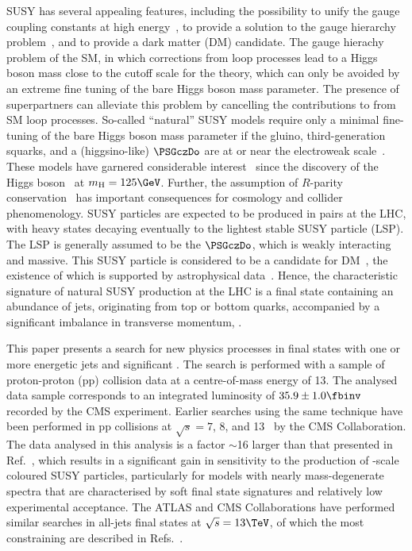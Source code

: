 SUSY has several appealing features, including the possibility to
unify the gauge coupling constants at high
energy~\cite{Dimopoulos:1981yj, Ibanez:1981yh, Marciano:1981un}, to
provide a solution to the gauge hierarchy
problem~\cite{ref:hierarchy1, ref:hierarchy2}, and to provide a dark
matter (DM) candidate. The gauge hierachy problem of the SM, in which
corrections from loop processes lead to a Higgs boson mass \higgsmass
close to the cutoff scale for the theory, which can only be avoided by
an extreme fine tuning of the bare Higgs boson mass parameter. The
presence of superpartners can alleviate this problem by cancelling the
contributions to \higgsmass from SM loop processes. So-called
``natural'' SUSY models require only a minimal fine-tuning of the bare
Higgs boson mass parameter if the gluino, third-generation squarks,
and a (higgsino-like) $\PSGczDo$ are at or near the electroweak
scale~\cite{ref:barbierinsusy}. These models have garnered
considerable interest~\cite{Delgado:2012eu, Boehm:1999tr,
  Carena:2008mj, Grober:2014aha, Grober:2015fia, Boehm:1999bj,
  Balazs:2004bu, Martin:2007gf, Martin:2007hn} since the discovery of
the Higgs boson~\cite{ref:atlashiggsdiscovery, ref:cmshiggsdiscovery,
  ref:cmshiggsdiscoverylong} at $\higgsmass = 125\GeV$. Further, the
assumption of $R$-parity conservation~\cite{Farrar:1978xj} has
important consequences for cosmology and collider phenomenology. SUSY
particles are expected to be produced in pairs at the LHC, with heavy
states decaying eventually to the lightest stable SUSY particle
(LSP). The LSP is generally assumed to be the $\PSGczDo$, which is
weakly interacting and massive. This SUSY particle is considered to be
a candidate for DM~\cite{Jungman:1995df}, the existence of which is
supported by astrophysical data~\cite{1674-1137-38-9-090001}. Hence,
the characteristic signature of natural SUSY production at the LHC is
a final state containing an abundance of jets, originating from top or
bottom quarks, accompanied by a significant imbalance in transverse
momentum, \ptvecmiss.

This paper presents a search for new physics processes in final states
with one or more energetic jets and significant \ptvecmiss. The search
is performed with a sample of proton-proton (pp) collision data at a
centre-of-mass energy of 13\TeV. The analysed data sample corresponds
to an integrated luminosity of $35.9 \pm 1.0\fbinv$ recorded by the
CMS experiment. Earlier searches using the same technique have been
performed in pp collisions at $\sqrt{s} = 7$, 8, and
13\TeV~\cite{RA1Paper, RA1Paper2011, RA1Paper2011FULL, RA1Paper2012,
  RA1Parked, RA1Paper2015} by the CMS Collaboration. The data analysed
in this analysis is a factor $\sim$16 larger than that presented in
Ref.~\cite{RA1Paper2015}, which results in a significant gain in
sensitivity to the production of \TeV-scale coloured SUSY particles,
particularly for models with nearly mass-degenerate spectra that are
characterised by soft final state signatures and relatively low
experimental acceptance. The ATLAS and CMS Collaborations have
performed similar searches in all-jets final states at $\sqrt{s} =
13\TeV$, of which the most constraining are described in
Refs.~\cite{}.

